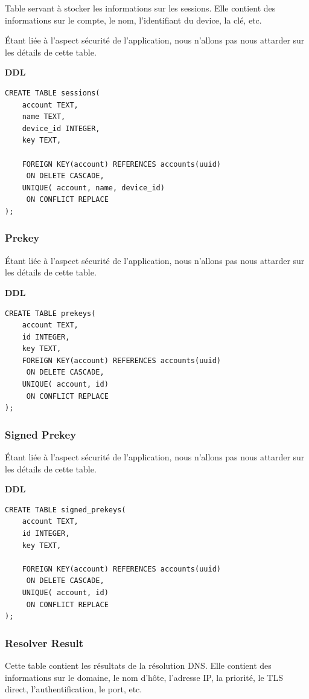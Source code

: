 \documentclass[a4paper,11pt]{article}
\begin{document}
Table servant à stocker les informations sur les sessions. Elle contient des informations sur le compte, le nom, l'identifiant du device, la clé, etc.

Étant liée à l'aspect sécurité de l'application, nous n'allons pas nous attarder sur les détails de cette table.

\textbf{DDL}
\begin{lstlisting}
CREATE TABLE sessions(
    account TEXT,
    name TEXT,
    device_id INTEGER,
    key TEXT,
    
    FOREIGN KEY(account) REFERENCES accounts(uuid)
     ON DELETE CASCADE,
    UNIQUE( account, name, device_id)
     ON CONFLICT REPLACE
);
\end{lstlisting}
\subsubsection*{Prekey}

Étant liée à l'aspect sécurité de l'application, nous n'allons pas nous attarder sur les détails de cette table.

\textbf{DDL}
\begin{lstlisting}
CREATE TABLE prekeys(
    account TEXT,
    id INTEGER,
    key TEXT,
    FOREIGN KEY(account) REFERENCES accounts(uuid)
     ON DELETE CASCADE,
    UNIQUE( account, id)
     ON CONFLICT REPLACE
);
\end{lstlisting}
\subsubsection*{Signed Prekey}

Étant liée à l'aspect sécurité de l'application, nous n'allons pas nous attarder sur les détails de cette table.

\textbf{DDL}
\begin{lstlisting}
CREATE TABLE signed_prekeys(
    account TEXT,
    id INTEGER,
    key TEXT,
    
    FOREIGN KEY(account) REFERENCES accounts(uuid)
     ON DELETE CASCADE,
    UNIQUE( account, id)
     ON CONFLICT REPLACE
);
\end{lstlisting}
\subsubsection*{Resolver Result}

Cette table contient les résultats de la résolution DNS. Elle contient des informations sur le domaine, le nom d'hôte, l'adresse IP, la priorité, le TLS direct, l'authentification, le port, etc.
\end{document}
